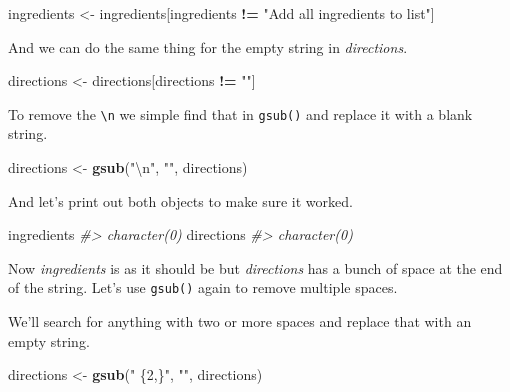 \documentclass[
  12pt,
]{book}
\newenvironment{Shaded}{\begin{snugshade}}{\end{snugshade}}
\newcommand{\CharTok}[1]{\textcolor[rgb]{0.31,0.60,0.02}{#1}}
\newcommand{\CommentTok}[1]{\textcolor[rgb]{0.56,0.35,0.01}{\textit{#1}}}
\newcommand{\KeywordTok}[1]{\textcolor[rgb]{0.13,0.29,0.53}{\textbf{#1}}}
\newcommand{\NormalTok}[1]{#1}
\newcommand{\OperatorTok}[1]{\textcolor[rgb]{0.81,0.36,0.00}{\textbf{#1}}}
\newcommand{\StringTok}[1]{\textcolor[rgb]{0.31,0.60,0.02}{#1}}
\begin{document}
\begin{Shaded}
\begin{Highlighting}[]
\NormalTok{ingredients <{-}}\StringTok{ }\NormalTok{ingredients[ingredients }\OperatorTok{!=}\StringTok{ "Add all ingredients to list"}\NormalTok{]}
\end{Highlighting}
\end{Shaded}

And we can do the same thing for the empty string in \emph{directions}.

\begin{Shaded}
\begin{Highlighting}[]
\NormalTok{directions <{-}}\StringTok{ }\NormalTok{directions[directions }\OperatorTok{!=}\StringTok{ ""}\NormalTok{]}
\end{Highlighting}
\end{Shaded}

To remove the \texttt{\textbackslash{}n} we simple find that in \texttt{gsub()} and replace it with a blank string.

\begin{Shaded}
\begin{Highlighting}[]
\NormalTok{directions <{-}}\StringTok{ }\KeywordTok{gsub}\NormalTok{(}\StringTok{"}\CharTok{\textbackslash{}n}\StringTok{"}\NormalTok{, }\StringTok{""}\NormalTok{, directions)}
\end{Highlighting}
\end{Shaded}

And let's print out both objects to make sure it worked.

\begin{Shaded}
\begin{Highlighting}[]
\NormalTok{ingredients}
\CommentTok{\#> character(0)}
\NormalTok{directions}
\CommentTok{\#> character(0)}
\end{Highlighting}
\end{Shaded}

Now \emph{ingredients} is as it should be but \emph{directions} has a bunch of space at the end of the string. Let's use \texttt{gsub()} again to remove multiple spaces.

We'll search for anything with two or more spaces and replace that with an empty string.

\begin{Shaded}
\begin{Highlighting}[]
\NormalTok{directions <{-}}\StringTok{ }\KeywordTok{gsub}\NormalTok{(}\StringTok{" \{2,\}"}\NormalTok{, }\StringTok{""}\NormalTok{, directions)}
\end{Highlighting}
\end{Shaded}
\end{document}
